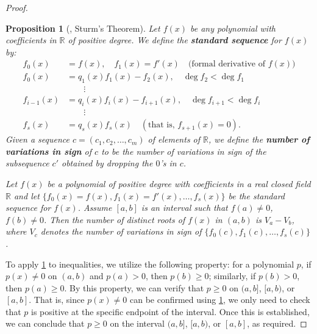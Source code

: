\documentclass{article}
\theoremstyle{plain}
\newtheorem{proposition}[theorem]{Proposition}
\theoremstyle{definition}
\theoremstyle{remark}
\newcommand{\R}{\mathbb{R}}
\begin{document}
\begin{proof}
\begin{proposition}[\citet{jacobson1985}, Sturm's Theorem]
    \label{prop:sturm}
    Let $f(x)$ be any polynomial with coefficients in $\R$ of positive degree. We define the \textbf{standard sequence} for $f(x)$ by:
    \begin{align*}
    	f_0(x) &= f(x), \quad f_1(x) = f'(x) \quad \text{(formal derivative of } f(x)) \\
    	f_0(x) &= q_1(x)f_1(x) - f_2(x), \quad \deg f_2 < \deg f_1 \\
    	& \qquad \vdots \\
    	f_{i-1}(x) &= q_i(x)f_i(x) - f_{i+1}(x), \quad \deg f_{i+1} < \deg f_i \\
    	& \qquad \vdots \\
    	f_s(x) &= q_s(x)f_s(x) \quad (\text{that is, } f_{s+1}(x) = 0).
    \end{align*}
    Given a sequence $c = (c_1, c_2, \dots, c_m)$ of elements of $\R$, we define the \textbf{number of variations in sign} of $c$ to be the number of variations in sign of the subsequence $c'$ obtained by dropping the $0$'s in $c$.
    
    Let $f(x)$ be a polynomial of positive degree with coefficients in a real closed field $\R$ and let $\{f_0(x) = f(x), f_1(x) = f'(x), \dots, f_s(x)\}$ be the standard sequence for $f(x)$. Assume $[a, b]$ is an interval such that $f(a) \neq 0$, $f(b) \neq 0$. Then the number of distinct roots of $f(x)$ in $(a, b)$ is $V_a - V_b$, where $V_c$ denotes the number of variations in sign of $\{f_0(c), f_1(c), \dots, f_s(c)\}$.
\end{proposition}

To apply \cref{prop:sturm} to inequalities, we utilize the following property: for a polynomial $p$, if $p(x) \ne 0$ on $(a, b)$ and $p(a) > 0$, then $p(b) \ge 0$; similarly, if $p(b) > 0$, then $p(a) \ge 0$. By this property, we can verify that $p \ge 0$ on $(a, b]$, $[a, b)$, or $[a, b]$. That is, since $p(x) \ne 0$ can be confirmed using \cref{prop:sturm}, we only need to check that $p$ is positive at the specific endpoint of the interval. Once this is established, we can conclude that $p \ge 0$ on the interval $(a, b]$, $[a, b)$, or $[a, b]$, as required.


\end{proof}
\end{document}
